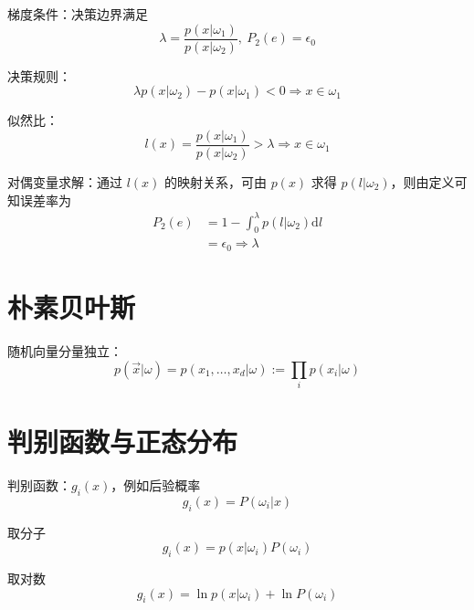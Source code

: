\documentclass[openany]{ctexbook}
\theoremstyle{kaiti}
\theoremstyle{normal}
\begin{document}
梯度条件：决策边界满足
\begin{equation}
\lambda =\frac{p\left(x|\omega_1 \right)}{p\left(x|\omega_2 \right)},~P_2\left(e \right)=\epsilon_0
\end{equation}

决策规则：
\begin{equation}
\lambda p\left(x|\omega_2 \right)-p\left(x|\omega_1 \right)<0\Rightarrow x\in \omega_1
\end{equation}

似然比：
\begin{equation}
l(x)=\frac{p\left(x|\omega_1 \right)}{p\left(x|\omega_2 \right)}>\lambda \Rightarrow x\in \omega_1
\end{equation}

对偶变量求解：通过 $l(x)$ 的映射关系，可由 $p(x)$ 求得 $p\left(l|\omega_2 \right)$，则由定义可知误差率为
\begin{equation}
\begin{aligned}
  P_2\left(e \right)
  &=1-\int_0^{\lambda}{p\left(l|\omega_2 \right)\mathrm{d}l}\\
  &=\epsilon_0\Rightarrow \lambda
\end{aligned}
\end{equation}

\section{朴素贝叶斯}

随机向量分量独立：
\begin{equation}
p\left(\vec{x}|\omega \right)=p\left(x_1,\dots ,x_d|\omega \right):=\prod_ip\left(x_i|\omega \right)
\end{equation}

\section{判别函数与正态分布}

判别函数：$g_i(x)$，例如后验概率
\begin{equation}
g_i(x)=P\left(\omega_i|x \right)
\end{equation}

取分子
\begin{equation}
g_i(x)=p\left(x|\omega_i \right)P\left(\omega_i \right)
\end{equation}

取对数
\begin{equation}
g_i(x)=\ln p\left(x|\omega_i \right)+\ln P\left(\omega_i \right)
\end{equation}
\end{document}
